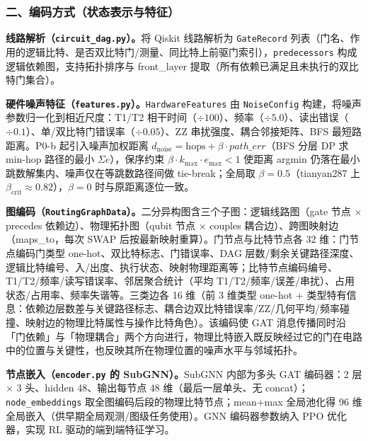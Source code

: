 \subsubsection{二、编码方式（状态表示与特征）}

\textbf{线路解析（\texttt{circuit\_dag.py}）。}将 Qiskit 线路解析为 \texttt{GateRecord} 列表（门名、作用的逻辑比特、是否双比特门/测量、同比特上前驱门索引），\texttt{predecessors} 构成逻辑依赖图，支持拓扑排序与 front\_layer 提取（所有依赖已满足且未执行的双比特门集合）。

\textbf{硬件噪声特征（\texttt{features.py}）。}\texttt{HardwareFeatures} 由 \texttt{NoiseConfig} 构建，将噪声参数归一化到相近尺度：T1/T2 相干时间（$\div100$）、频率（$\div5.0$）、读出错误（$\div0.1$）、单/双比特门错误率（$\div0.05$）、ZZ 串扰强度、耦合邻接矩阵、BFS 最短路距离。P0-b 起引入噪声加权距离 $d_{\mathrm{noise}}=\mathrm{hops}+\beta\cdot path\_err$（BFS 分层 DP 求 min-hop 路径的最小 $\Sigma e$），保序约束 $\beta\cdot k_{\max}\cdot e_{\max}<1$ 使距离 argmin 仍落在最小跳数解集内、噪声仅在等跳数路径间做 tie-break；全局取 $\beta=0.5$（tianyan287 上 $\beta_{\mathrm{crit}}\approx0.82$），$\beta=0$ 时与原距离逐位一致。

\textbf{图编码（\texttt{RoutingGraphData}）。}二分异构图含三个子图：逻辑线路图（gate 节点 $\times$ precedes 依赖边）、物理拓扑图（qubit 节点 $\times$ couples 耦合边）、跨图映射边（maps\_to，每次 SWAP 后按最新映射重算）。门节点与比特节点各 32 维：门节点编码门类型 one-hot、双比特标志、门错误率、DAG 层数/剩余关键路径深度、逻辑比特编号、入/出度、执行状态、映射物理距离等；比特节点编码编号、T1/T2/频率/读写错误率、邻居聚合统计（平均 T1/T2/频率/误差/串扰）、占用状态/占用率、频率失谐等。三类边各 16 维（前 3 维类型 one-hot + 类型特有信息：依赖边层数差与关键路径标志、耦合边双比特错误率/ZZ/几何平均/频率碰撞、映射边的物理比特属性与操作比特角色）。该编码使 GAT 消息传播同时沿「门依赖」与「物理耦合」两个方向进行，物理比特嵌入既反映经过它的门在电路中的位置与关键性，也反映其所在物理位置的噪声水平与邻域拓扑。

\textbf{节点嵌入（\texttt{encoder.py} 的 SubGNN）。}SubGNN 内部为多头 GAT 编码器：2 层 $\times$ 3 头、hidden 48、输出每节点 48 维（最后一层单头、无 concat）；\texttt{node\_embeddings} 取全图编码后段的物理比特节点；mean+max 全局池化得 96 维全局嵌入（供早期全局观测/图级任务使用）。GNN 编码器参数纳入 PPO 优化器，实现 RL 驱动的端到端特征学习。

